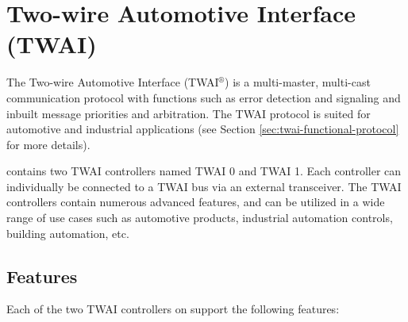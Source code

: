 \documentclass[main\_\_EN.tex]{subfiles}
\begin{document}

\ifglobal
\else
    {\let\clearpage\relax \listoftodos}
    \tableofcontents
    \listoftables
    \listoffigures
\fi



\hypertarget{twai}{}
\chapter{Two-wire Automotive Interface (TWAI)}
\label{mod:twai}


The Two-wire Automotive Interface (TWAI$^\circledR$) is a multi-master, multi-cast communication protocol with functions such as error detection and signaling and inbuilt message priorities and arbitration. The TWAI protocol is suited for automotive and industrial applications (see Section \ref{sec:twai-functional-protocol} for more details).

\chipname{} contains two TWAI controllers named TWAI 0 and TWAI 1. Each controller can individually be connected to a TWAI bus via an external transceiver. The TWAI controllers contain numerous advanced features, and can be utilized in a wide range of use cases such as automotive products, industrial automation controls, building automation, etc.

\section{Features}
Each of the two TWAI controllers on \chipname{} support the following features:
\end{document}
